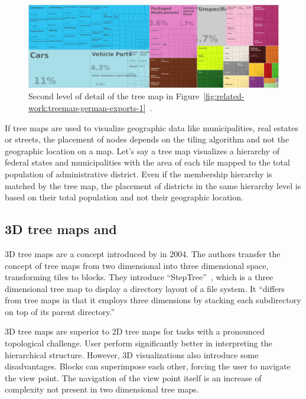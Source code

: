 \begin{figure}[ht]
    \centering
    \includegraphics[width=\textwidth]{figures/related-work/en_profile_country_deu_2}
    \caption{Second level of detail of the tree map in Figure~\ref{fig:related-work:treemap-german-exports-1}~\parencite{Observatory2017}.}
    \label{fig:related-work:treemap-german-exports-2}
\end{figure}

If tree maps are used to visualize geographic data like municipalities, real estates or streets, the placement of nodes depends on the tiling algorithm and not the geographic location on a map.
Let's say a tree map visualizes a hierarchy of federal states and municipalities with the area of each tile mapped to the total population of administrative district.
Even if the membership hierarchy is matched by the tree map, the placement of districts in the same hierarchy level is based on their total population and not their geographic location.

\subsection{3D tree maps and \tmaps{}}
3D tree maps are a concept introduced by \textcite{Bladh2004} in 2004.
The authors transfer the concept of tree maps from two dimensional into three dimensional space, transforming tiles to blocks.
They introduce ``StepTree''~\parencite{Bladh2004}, which is a three dimensional tree map to display a directory layout of a file system.
It ``differs from tree maps in that it employs three dimensions by stacking each subdirectory on top of its parent directory.''

3D tree maps are superior to 2D tree maps for tasks with a pronounced topological challenge.
User perform significantly better in interpreting the hierarchical structure.
However, 3D visualizations also introduce some disadvantages.
Blocks can superimpose each other, forcing the user to navigate the view point.
The navigation of the view point itself is an increase of complexity not present in two dimensional tree maps.

